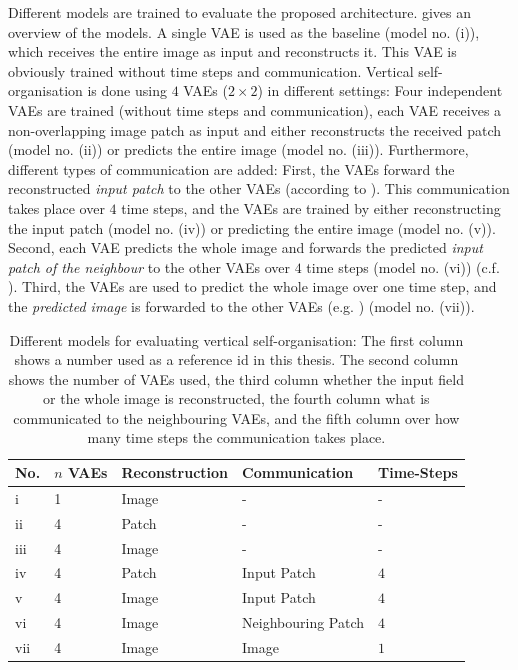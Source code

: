 Different models are trained to evaluate the proposed architecture.  gives an overview of the models. A single VAE is used as the baseline (model no. (i)), which receives the entire image as input and reconstructs it. This VAE is obviously trained without time steps and communication. Vertical self-organisation is done using $4$ VAEs ($2\times 2$) in different settings: Four independent VAEs are trained (without time steps and communication), each VAE receives a non-overlapping image patch as input and either reconstructs the received patch (model no. (ii)) or predicts the entire image (model no. (iii)). Furthermore, different types of communication are added: First, the VAEs forward the reconstructed \emph{input patch} to the other VAEs (according to ). This communication takes place over $4$ time steps, and the VAEs are trained by either reconstructing the input patch (model no. (iv)) or predicting the entire image (model no. (v)). Second, each VAE predicts the whole image and forwards the predicted \emph{input patch of the neighbour} to the other VAEs over $4$ time steps  (model no. (vi)) (c.f. ). Third, the VAEs are used to predict the whole image over one time step, and the \emph{predicted image} is forwarded to the other VAEs (e.g. ) (model no. (vii)).


\begin{table}[h] 
    \centering
	 \begin{tabular}{l l l l l}
    	\textbf{No.} & \textbf{$n$ VAEs} & \textbf{Reconstruction} & \textbf{Communication} & \textbf{Time-Steps}\\
        \hline
		i & 1 & Image & -  & -\\
		ii & 4 & Patch & -  & -\\
		iii & 4 & Image & - & -\\
		iv & 4 & Patch & Input Patch & $4$\\ %
		v & 4 & Image & Input Patch & $4$\\  %
		vi & 4 & Image & Neighbouring Patch & $4$\\ %
		vii & 4 & Image & Image & $1$\\
    \end{tabular}
    \caption[Different models to evaluate vertical self-organisation]{Different models for evaluating vertical self-organisation: The first column shows a number used as a reference id in this thesis. The second column shows the number of VAEs used, the third column whether the input field or the whole image is reconstructed, the fourth column what is communicated to the neighbouring VAEs, and the fifth column over how many time steps the communication takes place.}
\end{table}

